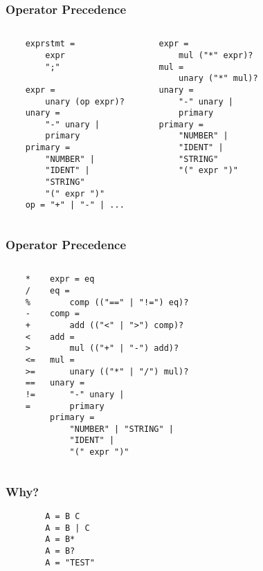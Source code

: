 \documentclass{beamer}
\begin{document}
    \begin{frame}[fragile]
        \frametitle{Operator Precedence}
        \begin{columns}
        \begin{verbatim}
    exprstmt = 
        expr
        ";"
    
    expr = 
        unary (op expr)?
    unary = 
        "-" unary |
        primary
    primary =
        "NUMBER" |
        "IDENT" | 
        "STRING"
        "(" expr ")"
    op = "+" | "-" | ...
                \end{verbatim}
        \pause
        \begin{verbatim}
    expr = 
        mul ("*" expr)?
    mul = 
        unary ("*" mul)?
    unary = 
        "-" unary |
        primary
    primary =
        "NUMBER" |
        "IDENT" | 
        "STRING"
        "(" expr ")"
        \end{verbatim}
        \end{columns}
    \end{frame}

    \begin{frame}[fragile]
        \frametitle{Operator Precedence}
        \begin{columns}
        \begin{verbatim}
    *
    /
    %
    -
    +
    <
    >
    <=
    >=
    ==
    !=
    =
        \end{verbatim}
        \pause
        \begin{verbatim}
expr = eq
eq = 
    comp (("==" | "!=") eq)?
comp = 
    add (("<" | ">") comp)?
add = 
    mul (("+" | "-") add)?
mul = 
    unary (("*" | "/") mul)?
unary = 
    "-" unary |
    primary
primary =
    "NUMBER" | "STRING" |
    "IDENT" | 
    "(" expr ")"
        \end{verbatim}
        \end{columns}
    \end{frame}

    \begin{frame}[fragile]
    \frametitle{Why?}
    \begin{center}
    \begin{verbatim}
        A = B C
        A = B | C
        A = B*
        A = B?
        A = "TEST"
    \end{verbatim}
    \end{center}
    \end{frame}
\end{document}
